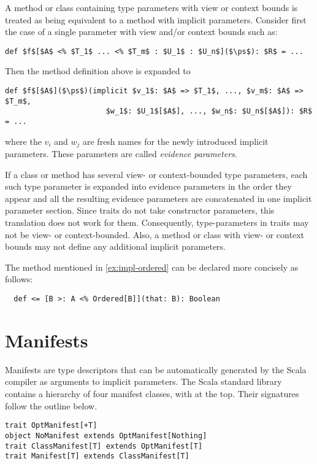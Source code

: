 A method or class containing type parameters with view or context bounds is treated as being
equivalent to a method with implicit parameters. Consider first the case of a
single parameter with view and/or context bounds such as:
\begin{lstlisting}
def $f$[$A$ <% $T_1$ ... <% $T_m$ : $U_1$ : $U_n$]($\ps$): $R$ = ...
\end{lstlisting}
Then the method definition above is expanded to
\begin{lstlisting}
def $f$[$A$]($\ps$)(implicit $v_1$: $A$ => $T_1$, ..., $v_m$: $A$ => $T_m$,
                       $w_1$: $U_1$[$A$], ..., $w_n$: $U_n$[$A$]): $R$ = ...
\end{lstlisting}
where the $v_i$ and $w_j$ are fresh names for the newly introduced implicit parameters. These
parameters are called {\em evidence parameters}.

If a class or method has several view- or context-bounded type parameters, each
such type parameter is expanded into evidence parameters in the order
they appear and all the resulting evidence parameters are concatenated
in one implicit parameter section.  Since traits do not take
constructor parameters, this translation does not work for them.
Consequently, type-parameters in traits may not be view- or context-bounded.
Also, a method or class with view- or context bounds may not define any
additional implicit parameters.

\example The \code{<=} method mentioned in \ref{ex:impl-ordered} can be declared
more concisely as follows:
\begin{lstlisting}
  def <= [B >: A <% Ordered[B]](that: B): Boolean
\end{lstlisting}

\section{Manifests}\label{sec:manifests}

\newcommand{\Mobj}{\mbox{\sl Mobj}}

Manifests are type descriptors that can be automatically generated by
the Scala compiler as arguments to implicit parameters. The Scala
standard library contains a hierarchy of four manifest classes, 
with \lstinline@OptManifest@
at the top. Their signatures follow the outline below.
\begin{lstlisting}
trait OptManifest[+T]
object NoManifest extends OptManifest[Nothing]
trait ClassManifest[T] extends OptManifest[T]
trait Manifest[T] extends ClassManifest[T]
\end{lstlisting}

